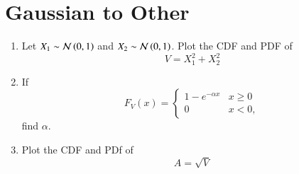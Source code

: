 \documentclass[journal,12pt,twocolumn]{IEEEtran}
\renewcommand\thesection{\arabic{section}}
\begin{document}
\section{Gaussian to Other}
\begin{enumerate}[label=\thesection.\arabic*
,ref=\thesection.\theenumi]
\item
Let $X_1 \sim  \mathcal{N}\left(0,1\right)$ and $X_2 \sim  \mathcal{N}\left(0,1\right)$. Plot the CDF and PDF of
%
\begin{equation}
V = X_1^2 + X_2^2
\end{equation}
%
%
%
\item
If
%
\begin{equation}
F_{V}(x) = 
\begin{cases}
1 - e^{-\alpha x} & x \geq 0 \\
0 & x < 0,
\end{cases}
\end{equation}
%
find $\alpha$.
%
\item
\label{ch3_raleigh_sim}
Plot the CDF and PDf of
%
\begin{equation}
A = \sqrt{V}
\end{equation}
%
\end{enumerate}
\end{document}
